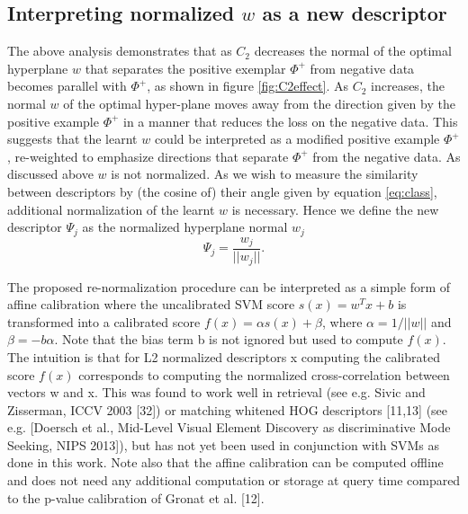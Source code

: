 \documentclass[10pt,twocolumn,letterpaper]{article}
\begin{document}
   \subsection{Interpreting normalized $w$ as a new descriptor} %
      The above analysis demonstrates that as $C_2$ decreases the normal of the optimal hyperplane $w$ that separates the positive exemplar $\Phi^+$ from negative data becomes parallel with $\Phi^+$, as shown in figure \ref{fig:C2effect}. As $C_2$ increases, the normal $w$ of the optimal hyper-plane moves away from the direction given by the positive example $\Phi^+$ in a manner that reduces the loss on the negative data. 
      This suggests that the learnt $w$ could be interpreted as a modified positive example $\Phi^+$, re-weighted to emphasize directions that separate $\Phi^+$ from the negative data. As discussed above $w$ is not normalized. As we wish to measure the similarity between descriptors by (the cosine of) their angle        
      given by equation \eqref{eq:class}, additional normalization of the learnt $w$ is necessary. Hence we define the new descriptor $\Psi_j$ as the normalized hyperplane normal $w_j$
         \begin{equation}
            \label{eq:normalization}
            \Psi_j=\dfrac{w_j}{||w_j||}.
         \end{equation}

      \textcolor{petr}{
        The proposed re-normalization procedure can be interpreted as a simple form of affine calibration where the uncalibrated SVM score $s(x)=w^T x+b$ is transformed into a calibrated score $f(x)=\alpha s(x)+\beta$, where $\alpha = 1/||w||$ and $\beta = -b\alpha$. Note that the bias term b is not ignored but used to compute $f(x)$. The intuition is that for L2 normalized descriptors x computing the calibrated score $f(x)$ corresponds to computing the normalized cross-correlation between vectors w and x. This was found to work well in retrieval (see e.g. Sivic and Zisserman, ICCV 2003 [32]) or matching whitened HOG descriptors [11,13] (see e.g. [Doersch et al., Mid-Level Visual Element Discovery as discriminative Mode Seeking, NIPS 2013]), but has not yet been used in conjunction with SVMs as done in this work. Note also that the affine calibration can be computed offline and does not need any additional computation or storage at query time compared to the p-value calibration of Gronat et al. [12].
      }
\end{document}
